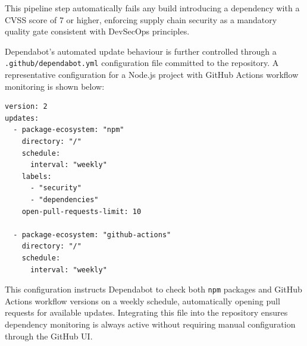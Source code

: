 \documentclass[12pt,a4paper]{article}
\begin{document}
This pipeline step automatically fails any build introducing a dependency with a CVSS score
of 7 or higher, enforcing supply chain security as a mandatory quality gate consistent with
DevSecOps principles.

Dependabot's automated update behaviour is further controlled through a
\texttt{.github/dependabot.yml} configuration file committed to the repository. A
representative configuration for a Node.js project with GitHub Actions workflow monitoring
is shown below:

\begin{lstlisting}[caption={.github/dependabot.yml --- Scheduled Dependabot update configuration}]
version: 2
updates:
  - package-ecosystem: "npm"
    directory: "/"
    schedule:
      interval: "weekly"
    labels:
      - "security"
      - "dependencies"
    open-pull-requests-limit: 10

  - package-ecosystem: "github-actions"
    directory: "/"
    schedule:
      interval: "weekly"
\end{lstlisting}

This configuration instructs Dependabot to check both \texttt{npm} packages and GitHub
Actions workflow versions on a weekly schedule, automatically opening pull requests for
available updates. Integrating this file into the repository ensures dependency monitoring
is always active without requiring manual configuration through the GitHub UI.

\newpage


\end{document}
